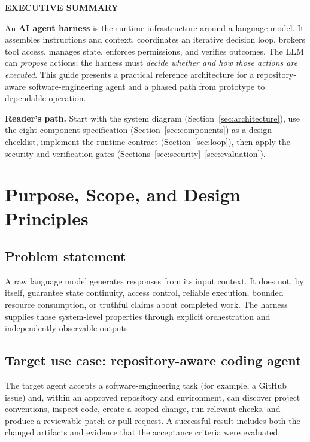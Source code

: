 \documentclass[10pt,letterpaper]{article}
\newcommand{\term}[1]{\textbf{\color{DeepBlue}#1}}
\newcommand{\smallcaplabel}[1]{\textsf{\bfseries\footnotesize\color{Ocean}\MakeUppercase{#1}}}
\begin{document}
\hypersetup{pageanchor=true}
\setcounter{page}{1}
\begingroup
\small
\setlength{\parskip}{0pt}
\tableofcontents
\endgroup
\clearpage
\vspace{3mm}
\begin{summarybox}
\smallcaplabel{Executive summary}\par
An \term{AI agent harness} is the runtime infrastructure around a language model. It assembles instructions and context, coordinates an iterative decision loop, brokers tool access, manages state, enforces permissions, and verifies outcomes. The LLM can \emph{propose} actions; the harness must \emph{decide whether and how those actions are executed}. This guide presents a practical reference architecture for a repository-aware software-engineering agent and a phased path from prototype to dependable operation.
\end{summarybox}
\vspace{4mm}
\textbf{Reader's path.} Start with the system diagram (Section~\ref{sec:architecture}), use the eight-component specification (Section~\ref{sec:components}) as a design checklist, implement the runtime contract (Section~\ref{sec:loop}), then apply the security and verification gates (Sections~\ref{sec:security}--\ref{sec:evaluation}).
\medskip

\section{Purpose, Scope, and Design Principles}\label{sec:purpose}
\subsection{Problem statement}
A raw language model generates responses from its input context. It does not, by itself, guarantee state continuity, access control, reliable execution, bounded resource consumption, or truthful claims about completed work. The harness supplies those system-level properties through explicit orchestration and independently observable outputs.

\subsection{Target use case: repository-aware coding agent}
The target agent accepts a software-engineering task (for example, a GitHub issue) and, within an approved repository and environment, can discover project conventions, inspect code, create a scoped change, run relevant checks, and produce a reviewable patch or pull request. A successful result includes both the changed artifacts and evidence that the acceptance criteria were evaluated.
\end{document}
